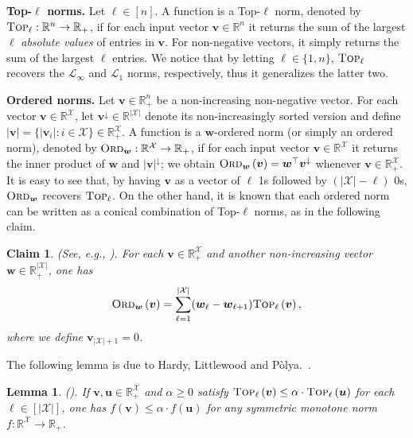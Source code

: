\documentclass[11pt,a4paper]{article} \usepackage{enumitem}
\newcommand{\calX}{\mathcal{X}}
\newcommand{\calL}{\mathcal{L}}
\newcommand{\da}{\downarrow}
\newcommand{\boldu}{\boldsymbol{u}}
\newcommand{\boldv}{\boldsymbol{v}}
\newcommand{\boldw}{\boldsymbol{w}}
\newcommand{\topdash}[1]{\mbox{Top-$#1$}}
\newcommand{\topp}[1]{\textsc{Top}_{#1}}
\newcommand{\topl}[2]{\textsc{Top}_{#1}\left(#2\right)}
\newcommand{\ordd}[1]{\textsc{Ord}_{#1}}
\newcommand{\ordered}[2]{\textsc{Ord}_{#1}\left(#2\right)}
\newcommand{\R}{\mathbb{R}}
\newcommand{\Rpos}{\mathbb{R}_+}
\newtheorem{lemma}[theorem]{Lemma}
\newtheorem{claim}[theorem]{Claim}
\theoremstyle{definition}
\begin{document}
\vspace{0.3cm}
\noindent 
{\bf \topdash{\ell} norms.}
Let $\ell\in[n]$.
A function is a \topdash{\ell} norm, denoted by $\topp{\ell}:\R^n\rightarrow\Rpos$, if for each input vector $\boldv\in\R^n$ it returns the sum of the largest $\ell$ \emph{absolute values} of entries in $\boldv$.
For non-negative vectors, it simply returns the sum of the largest $\ell$ entries.
We notice that by letting $\ell\in\{1,n\}$, $\topp{\ell}$ recovers the $\calL_\infty$ and $\calL_1$ norms, respectively, thus it generalizes the latter two.

\vspace{0.3cm}
\noindent 
{\bf Ordered norms.}
Let $\boldv\in\Rpos^{n}$ be a non-increasing non-negative vector.
For each vector $\boldv\in\R^{\calX}$, let $\boldv^\da\in\R^{|\calX|}$ denote its non-increasingly sorted version and define $|\boldv|=\{|\boldv_i|:i\in\calX\}\in\Rpos^{\calX}$. 
A function is a $\boldw$-ordered norm (or simply an ordered norm), denoted by 
$\ordd{\boldw}:\R^{\calX}\rightarrow\Rpos$, if for each input vector $\boldv\in\R^{\calX}$ it returns the inner product of $\boldw$ and $|\boldv|^\da$; we obtain $\ordered{\boldw}{\boldv}=\boldw^\top\boldv^\da$ whenever $\boldv\in\Rpos^{\calX}$.
It is easy to see that, by having $\boldv$ as a vector of $\ell$ 1s followed by $(|\calX|-\ell)$ 0s, $\ordd{\boldw}$ recovers $\topp{\ell}$.
On the other hand, it is known that each ordered norm can be written as a conical combination of \topdash{\ell} norms, as in the following claim.


\begin{claim}
\label{lemma:ordered:conic:decomp}
(See, e.g., \cite{chakrabarty2019approximation}).
For each $\boldv\in\Rpos^{\calX}$ and another non-increasing vector $\boldw\in\Rpos^{|\calX|}$, one has
\[
    \ordered{\boldw}{\boldv}=\sum_{\ell=1}^{|\calX|}(\boldw_{\ell}-\boldw_{\ell+1})\topl{\ell}{\boldv},
\]
where we define $\boldv_{|\calX|+1}=0$.
\end{claim}






The following lemma is due to Hardy, Littlewood and P\`olya.~\cite{hardy1934inequalities}.

\begin{lemma}\label{lemma:majorization}
(\cite{hardy1934inequalities}).
	If $\boldv,\boldu\in\Rpos^{\calX}$ and $\alpha\geq0$ satisfy $\topl{\ell}
{\boldv}\leq\alpha\cdot\topl{\ell}{\boldu}$ for each $\ell\in[|\calX|]$, one has 
$f(\boldv)\leq\alpha\cdot f(\boldu)$ for any symmetric monotone norm 
$f:\R^{\calX}\rightarrow\Rpos$.
\end{lemma}
\end{document}
